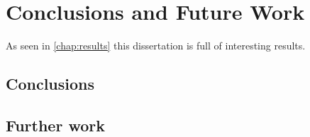 \chapter{Conclusions and Future Work} \label{chap:summary}
As seen in \cref{chap:results} this dissertation is full of interesting results.
\lipsum[20-25]

\section{Conclusions}
\lipsum[20-25]

\section{Further work}
\lipsum[20-25]